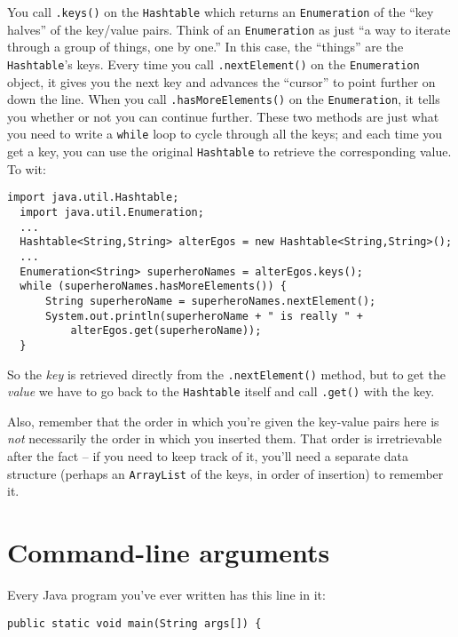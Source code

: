 You call \texttt{.keys()} on the \texttt{Hashtable} which returns an
\texttt{Enumeration} of the ``key halves'' of the key/value pairs. Think of an
\texttt{Enumeration} as just ``a way to iterate through a group of things, one
by one.'' In this case, the ``things'' are the \texttt{Hashtable}'s keys. Every
time you call \texttt{.nextElement()} on the \texttt{Enumeration} object, it
gives you the next key and advances the ``cursor'' to point further on down the
line. When you call \texttt{.hasMoreElements()} on the \texttt{Enumeration},
it tells you whether or not you can continue further. These two methods are
just what you need to write a \texttt{while} loop to cycle through all the
keys; and each time you get a key, you can use the original \texttt{Hashtable}
to retrieve the corresponding value. To wit:

\begin{Verbatim}[fontsize=\scriptsize,samepage=true,frame=single]
  import java.util.Hashtable;
  import java.util.Enumeration;
  ...
  Hashtable<String,String> alterEgos = new Hashtable<String,String>();
  ...
  Enumeration<String> superheroNames = alterEgos.keys();
  while (superheroNames.hasMoreElements()) {
      String superheroName = superheroNames.nextElement();
      System.out.println(superheroName + " is really " +
          alterEgos.get(superheroName));
  }
\end{Verbatim}

So the \textit{key} is retrieved directly from the \texttt{.nextElement()}
method, but to get the \textit{value} we have to go back to the
\texttt{Hashtable} itself and call \texttt{.get()} with the key.

Also, remember that the order in which you're given the key-value pairs here
is \textit{not} necessarily the order in which you inserted them. That order
is irretrievable after the fact -- if you need to keep track of it, you'll
need a separate data structure (perhaps an \texttt{ArrayList} of the keys, in
order of insertion) to remember it.

\section{Command-line arguments}

Every Java program you've ever written has this line in it:

\begin{Verbatim}[fontsize=\footnotesize,samepage=true,frame=single]
    public static void main(String args[]) {
\end{Verbatim}

